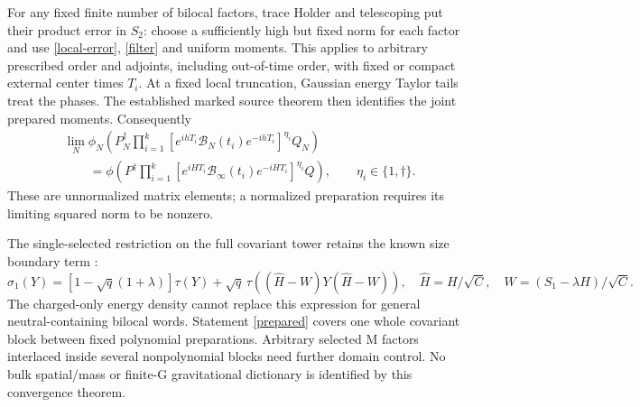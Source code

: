 \documentclass[11pt]{article}
\begin{document}
For any fixed finite number of bilocal factors, trace Holder
and telescoping put their product error in $S_2$: choose
a sufficiently high but fixed norm for each factor and use
\eqref{local-error}, \eqref{filter} and uniform moments.
This applies to arbitrary prescribed order and adjoints,
including out-of-time order, with fixed or compact external
center times $T_i$. At a fixed local truncation, Gaussian
energy Taylor tails treat the phases. The established marked
source theorem then identifies the joint prepared moments.
Consequently
\begin{align}
 &\lim_N\phi_N\left(P_N^\dagger
 \prod_{i=1}^k
 [e^{ihT_i}\mathcal B_N(t_i)e^{-ihT_i}]^{\eta_i}Q_N\right)
 \nonumber\\
 &\qquad=\phi\left(P^\dagger
 \prod_{i=1}^k
 [e^{iHT_i}\mathcal B_\infty(t_i)e^{-iHT_i}]^{\eta_i}Q\right),
 \qquad \eta_i\in\{1,\dagger\}.\label{prepared}
\end{align}
These are unnormalized matrix elements; a normalized preparation
requires its limiting squared norm to be nonzero.

The single-selected restriction on the full covariant tower
retains the known size boundary term \cite{higher,neutral}:
\[
 \sigma_1(Y)=[1-\sqrt q(1+\lambda)]\tau(Y)
       +\sqrt q\,\tau((\widehat H-W)Y(\widehat H-W)),
 \quad\widehat H=H/\sqrt C,\quad W=(S_1-\lambda H)/\sqrt C.
\]
The charged-only energy density cannot replace this expression
for general neutral-containing bilocal words. Statement
\eqref{prepared} covers one whole covariant block between fixed
polynomial preparations. Arbitrary selected M factors interlaced
inside several nonpolynomial blocks need further domain control.
No bulk spatial/mass or finite-G gravitational dictionary is
identified by this convergence theorem.

\newpage
\end{document}
